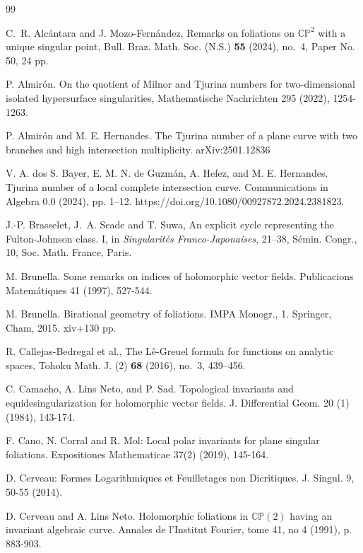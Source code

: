 \documentclass[11pt]{amsart}
\begin{document}
\begin{thebibliography}{99}



C.~R. Alc\'antara and J. Mozo-Fern\'andez, Remarks on foliations on $\mathbb{CP}^2$ with a unique singular point, Bull. Braz. Math. Soc. (N.S.) {\bf 55} (2024), no.~4, Paper No. 50, 24 pp.

 P. Almir\'on. On the quotient of Milnor and Tjurina numbers for two-dimensional isolated hypersurface singularities, Mathematische Nachrichten 295 (2022), 1254-1263. 

P. Almirón and M. E. Hernandes. The Tjurina number of a plane curve with two branches and high intersection multiplicity. 	arXiv:2501.12836

 V. A. dos S. Bayer, E. M. N. de Guzm\'an, A. Hefez, and M. E. Hernandes. Tjurina number of
a local complete intersection curve. Communications in Algebra 0.0 (2024), pp. 1–12.
https://doi.org/10.1080/00927872.2024.2381823.

J.-P. Brasselet, J.~A. Seade and T. Suwa, An explicit cycle representing the Fulton-Johnson class. I, in {\it Singularit\'es Franco-Japonaises}, 21--38, S\'emin. Congr., 10, Soc. Math. France, Paris.


 M. Brunella. Some remarks on indices of holomorphic vector fields. Publicacions Matem\'atiques 41 (1997), 527-544.



 M. Brunella. Birational geometry of foliations. IMPA Monogr., 1. Springer, Cham, 2015. xiv+130 pp.

R. Callejas-Bedregal et al., The L\^e-Greuel formula for functions on analytic spaces, Tohoku Math. J. (2) {\bf 68} (2016), no.~3, 439--456.

 C. Camacho, A. Lins Neto, and P. Sad.
Topological invariants and equidesingularization for
holomorphic vector fields. J. Differential Geom. 20 (1) (1984), 143-174.

F. Cano, N. Corral and R. Mol: Local polar invariants for plane singular foliations. Expositiones Mathematicae 37(2) (2019), 145-164.

D. Cerveau: Formes Logarithmiques et Feuilletages non Dicritiques. J. Singul. 9, 50-55 (2014).

 D. Cerveau and A. Lins Neto. Holomorphic foliations in $\mathbb C \mathbb P(2)$ having an invariant algebraic curve. Annales de l’Institut Fourier, tome 41, no 4 (1991), p. 883-903.


\end{thebibliography}
\end{document}
